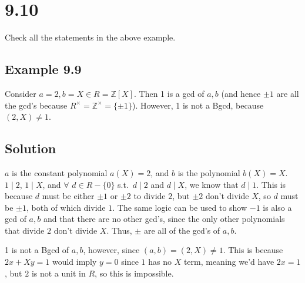 \documentclass[fleqn]{article}
\begin{document}
    \section{9.10}
    Check all the statements in the above example.
    
        \subsection{Example 9.9}
        Consider $a = 2, b = X \in R = \mathbb{Z}[X]$.  Then 1 is a gcd of $a, b$ (and hence $\pm 1$ are all the gcd's because $R^\times = \mathbb{Z}^\times = \{\pm 1\}$).  However, 1 is not a Bgcd, because $(2, X) \neq 1$.
        
        \subsection{Solution}
        $a$ is the constant polynomial $a(X) = 2$, and $b$ is the polynomial $b(X) = X$.  $1 \mid 2$, $1 \mid X$, and $\forall$ $d \in R - \{0\}$ s.t.\ $d \mid 2$ and $d \mid X$, we know that $d \mid 1$.  This is because $d$ must be either $\pm 1$ or $\pm 2$ to divide $2$, but $\pm 2$ don't divide $X$, so $d$ must be $\pm 1$, both of which divide $1$.  The same logic can be used to show $-1$ is also a gcd of $a, b$ and that there are no other gcd's, since the only other polynomials that divide $2$ don't divide $X$.  Thus, $\pm$ are all of the gcd's of $a, b$.
        
        1 is not a Bgcd of $a, b$, however, since $(a, b) = (2, X) \neq 1$.  This is because $2x + Xy = 1$ would imply $y = 0$ since $1$ has no $X$ term, meaning we'd have $2x = 1$, but $2$ is not a unit in $R$, so this is impossible.
    
\end{document}
